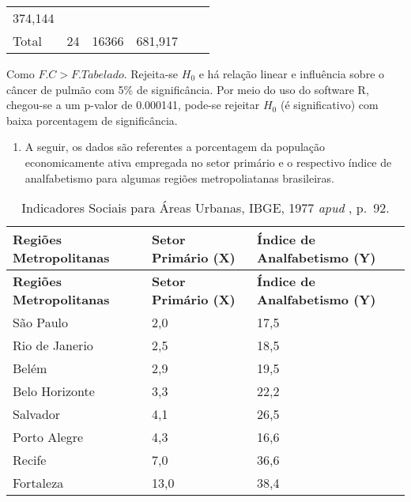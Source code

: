 \documentclass[
  openany]{book}
\providecommand{\tightlist}{%
  \setlength{\itemsep}{0pt}\setlength{\parskip}{0pt}}
\begin{document}
\begin{longtable}[]{@{}llllll@{}}
\begin{minipage}[t]{0.14\columnwidth}
374,144\strut
\end{minipage} & \begin{minipage}[t]{0.14\columnwidth}\raggedright
\strut
\end{minipage} & \begin{minipage}[t]{0.14\columnwidth}\raggedright
\strut
\end{minipage}\tabularnewline
\begin{minipage}[t]{0.14\columnwidth}\raggedright
Total\strut
\end{minipage} & \begin{minipage}[t]{0.14\columnwidth}\raggedright
24\strut
\end{minipage} & \begin{minipage}[t]{0.14\columnwidth}\raggedright
16366\strut
\end{minipage} & \begin{minipage}[t]{0.14\columnwidth}\raggedright
681,917\strut
\end{minipage} & \begin{minipage}[t]{0.14\columnwidth}\raggedright
\strut
\end{minipage} & \begin{minipage}[t]{0.14\columnwidth}\raggedright
\strut
\end{minipage}\tabularnewline
\bottomrule
\end{longtable}

Como \(F.C > F. Tabelado\). Rejeita-se \(H_0\) e há relação linear e influência sobre o câncer de pulmão com 5\% de significância. Por meio do uso do software R, chegou-se a um p-valor de 0.000141, pode-se rejeitar \(H_0\) (é significativo) com baixa porcentagem de significância.

\begin{enumerate}
\def\labelenumi{\arabic{enumi}.}
\setcounter{enumi}{1}
\tightlist
\item
  A seguir, os dados são referentes a porcentagem da população economicamente ativa empregada no setor primário e o respectivo índice de analfabetismo para algumas regiões metropoliatanas brasileiras.
\end{enumerate}

\begin{longtable}[]{@{}lll@{}}
\caption{\label{tab:ecoativa} Indicadores Sociais para Áreas Urbanas, IBGE, 1977 \emph{apud} \citep{morettin2017estatistica}, p.~92.}\tabularnewline
\toprule
\textbf{Regiões Metropolitanas} & \textbf{Setor Primário (X)} & \textbf{Índice de Analfabetismo (Y)}\tabularnewline
\midrule
\endfirsthead
\toprule
\textbf{Regiões Metropolitanas} & \textbf{Setor Primário (X)} & \textbf{Índice de Analfabetismo (Y)}\tabularnewline
\midrule
\endhead
São Paulo & 2,0 & 17,5\tabularnewline
Rio de Janerio & 2,5 & 18,5\tabularnewline
Belém & 2,9 & 19,5\tabularnewline
Belo Horizonte & 3,3 & 22,2\tabularnewline
Salvador & 4,1 & 26,5\tabularnewline
Porto Alegre & 4,3 & 16,6\tabularnewline
Recife & 7,0 & 36,6\tabularnewline
Fortaleza & 13,0 & 38,4\tabularnewline
\bottomrule
\end{longtable}
\end{document}
